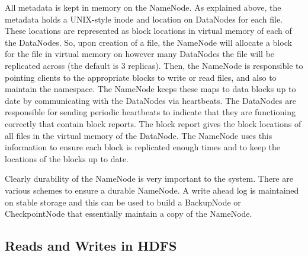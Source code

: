 \documentclass[11pt, a4paper]{article}
\begin{document}
\begin{multicols*}{2}
All metadata is kept in memory on the NameNode. As explained above, the metadata holds a UNIX-style inode and location on DataNodes for each file. These locations are represented as block locations in virtual memory of each of the DataNodes. So, upon creation of a file, the NameNode will allocate a block for the file in virtual memory on however many DataNodes the file will be replicated across (the default is 3 replicas). Then, the NameNode is responsible to pointing clients to the appropriate blocks to write or read files, and also to maintain the namespace. The NameNode keeps these maps to data blocks up to date by communicating with the DataNodes via heartbeats. The DataNodes are responsible for sending periodic heartbeats to indicate that they are functioning correctly that contain block reports. The block report gives the block locations of all files in the virtual memory of the DataNode. The NameNode uses this information to ensure each block is replicated enough times and to keep the locations of the blocks up to date. 

Clearly durability of the NameNode is very important to the system. There are various schemes to ensure a durable NameNode. A write ahead log is maintained on stable storage and this can be used to build a BackupNode or CheckpointNode that essentially maintain a copy of the NameNode. 







\subsection{Reads and Writes in HDFS}



\end{multicols*}
\end{document}
